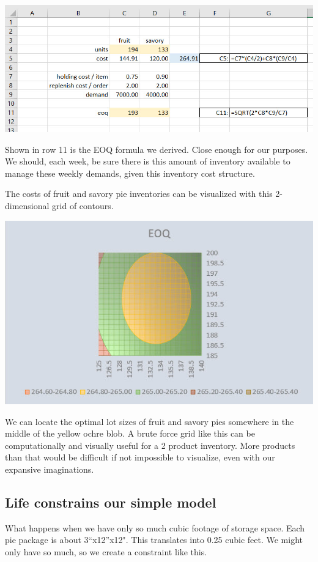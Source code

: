 \documentclass[
]{book}
\begin{document}
\includegraphics{images/04/eoq-simple-solver.jpg}

Shown in row 11 is the EOQ formula we derived. Close enough for our purposes. We should, each week, be sure there is this amount of inventory available to manage these weekly demands, given this inventory cost structure.

The costs of fruit and savory pie inventories can be visualized with this 2-dimensional grid of contours.

\includegraphics{images/04/eoq-cost-graph.jpg}

We can locate the optimal lot sizes of fruit and savory pies somewhere in the middle of the yellow ochre blob. A brute force grid like this can be computationally and visually useful for a 2 product inventory. More products than that would be difficult if not impossible to visualize, even with our expansive imaginations.

\hypertarget{life-constrains-our-simple-model}{%
\subsection{Life constrains our simple model}\label{life-constrains-our-simple-model}}

What happens when we have only so much cubic footage of storage space. Each pie package is about 3``x12''x12". This translates into 0.25 cubic feet. We might only have so much, so we create a constraint like this.
\end{document}
